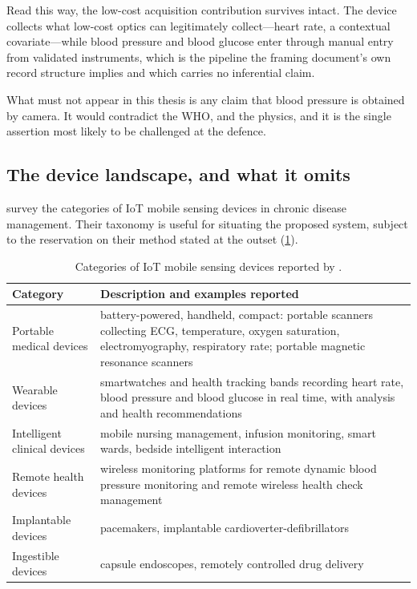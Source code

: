 \documentclass[12pt,a4paper,oneside]{report}
\begin{document}
Read this way, the low-cost acquisition contribution survives intact. The device collects what low-cost optics can legitimately collect---heart rate, a contextual covariate---while blood pressure and blood glucose enter through manual entry from validated instruments, which is the pipeline the framing document's own record structure implies and which carries no inferential claim.

What must not appear in this thesis is any claim that blood pressure is obtained by camera. It would contradict the WHO, \textcite{alessa2019} and the physics, and it is the single assertion most likely to be challenged at the defence.

\subsection{The device landscape, and what it omits}\label{sec:device-landscape}

\Textcite{liu2025review} survey the categories of IoT mobile sensing devices in chronic disease management. Their taxonomy is useful for situating the proposed system, subject to the reservation on their method stated at the outset (\cref{tab:device-categories}).

\begin{table}[htbp]
\centering\footnotesize
\caption{Categories of IoT mobile sensing devices reported by \textcite{liu2025review}.}\label{tab:device-categories}
\begin{tabularx}{\textwidth}{@{}>{\raggedright\arraybackslash}p{3.5cm} X@{}}
\toprule
\textbf{Category} & \textbf{Description and examples reported} \\
\midrule
Portable medical devices & battery-powered, handheld, compact: portable scanners collecting ECG, temperature, oxygen saturation, electromyography, respiratory rate; portable magnetic resonance scanners \\
Wearable devices & smartwatches and health tracking bands recording heart rate, blood pressure and blood glucose in real time, with analysis and health recommendations \\
Intelligent clinical devices & mobile nursing management, infusion monitoring, smart wards, bedside intelligent interaction \\
Remote health devices & wireless monitoring platforms for remote dynamic blood pressure monitoring and remote wireless health check management \\
Implantable devices & pacemakers, implantable cardioverter-defibrillators \\
Ingestible devices & capsule endoscopes, remotely controlled drug delivery \\
\bottomrule
\end{tabularx}
\end{table}
\end{document}
